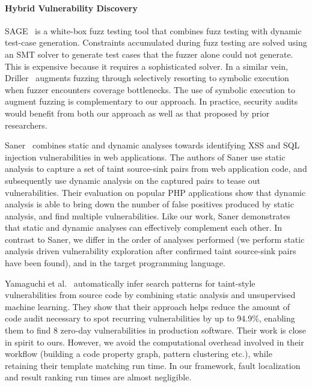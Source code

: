 \paragraph{Hybrid Vulnerability Discovery}
SAGE~\cite{godefroid2012} is a white-box fuzz testing tool that combines fuzz testing with dynamic test-case generation.
Constraints accumulated during fuzz testing are solved using an SMT solver to generate test cases that the fuzzer alone could not generate.
This is expensive because it requires a sophisticated solver.
In a similar vein, Driller~\cite{stephens2016driller} augments fuzzing through selectively resorting to symbolic execution when fuzzer encounters coverage bottlenecks.
The use of symbolic execution to augment fuzzing is complementary to our approach.
In practice, security audits would benefit from both our approach as well as that proposed by prior researchers.

Saner~\cite{balzarotti2008} combines static and dynamic analyses towards identifying XSS and SQL injection vulnerabilities in web applications.
The authors of Saner use static analysis to capture a set of taint source-sink pairs from web application code, and subsequently use dynamic analysis on the captured pairs to tease out vulnerabilities.
Their evaluation on popular PHP applications show that dynamic analysis is able to bring down the number of false positives produced by static analysis, and find multiple vulnerabilities.
Like our work, Saner demonstrates that static and dynamic analyses can effectively complement each other.
In contrast to Saner, we differ in the order of analyses performed (we perform static analysis driven vulnerability exploration after confirmed taint source-sink pairs have been found), and in the target programming language.

Yamaguchi et al.~\cite{yamaguchi2015automatic} automatically infer search patterns for taint-style vulnerabilities from source code by combining static analysis and unsupervised machine learning.
They show that their approach helps reduce the amount of code audit necessary to spot recurring vulnerabilities by up to 94.9\%, enabling them to find 8 zero-day vulnerabilities in production software.
Their work is close in spirit to ours.
However, we avoid the computational overhead involved in their workflow (building a code property graph, pattern clustering etc.), while retaining their template matching run time.
In our framework, fault localization and result ranking run times are almost negligible.
